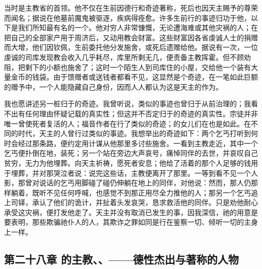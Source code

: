 当时是主教省的首领。他不仅在生前因德行和奇迹著称，死后也因天主赐予的尊荣而闻名；据说在他墓前魔鬼被驱逐，疾病得痊愈。许多生前行的事迹归功于他，以下是我们所知最有名的一个。他对穷人非常慷慨，无论遭海难或其他灾祸的人；在把自己的全部家产用于周济后，又动用教会财富。这些财富因各省虔诚人士的捐赠而大增，他们因钦佩，生前委托他分发施舍，或死后遗赠给他。据说有一次，一位虔诚的司库发现教会收入几乎耗尽，库里所剩无几，便责备主教挥霍。但不顾劝阻，把剩下的小额也施舍了；这时一个陌生人到司库住的小屋，交给他一个装有大量金币的钱袋。由于馈赠者或送钱者都看不见，这显然是个奇迹，在一笔如此巨额的赠予中，一个人能隐藏自己身份，因而人人都认为这是天主的作为。\par

我也愿讲述另一桩归于的奇迹。我曾听说，类似的事迹也曾归于从前治理的；我看不出有任何理由怀疑记载的真实性；但这并不否定归于的奇迹的真实性。宗徒并非唯一曾使死者复活的人；福音作者在行了类似的奇迹；的女儿们在也是如此。在不同的时代，天主的人曾行过类似的事迹。我想举出的奇迹如下：两个乞丐打听到何时会经过那条路，便约定用计谋从他那里多讨些施舍。一看到主教走近，其中一个乞丐便扑倒在地，装死；另一个站在旁边大声哀号，痛悼同伴的去世，并哀叹自己贫穷，无力为他埋葬。向天主祈祷，愿死者安息；他给了活着的那个人足够的钱用于埋葬，并对那哭泣者说：说完这些话，主教便离开了那里。一等到看不见一个人影，那曾对说话的乞丐用脚碰了碰仍伸躺在地上的同伴，对他说：然而，那人仍那样躺着，既听不见任何呼喊，也感觉不到那正用尽全力推他的人；那另一个乞丐追上司铎，承认了他们的诡计，并扯着头发哀哭，恳求救活他的同伴。只是劝他耐心承受这灾祸，便打发他走了。天主并没有取消已发生的事，因我深信，祂的用意是要表明，那些欺骗祂仆人的人，其欺诈之罪如同是行在鉴察一切、倾听一切的主身上一样。\par


\subsection{第二十八章 的主教、、——德性杰出与著称的人物}

